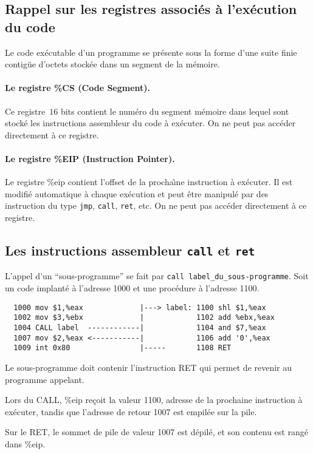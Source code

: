 \begin{frame}
  \section{Rappel sur les registres associ\'es \`a l'ex\'ecution du code}%

        Le code ex\'ecutable d'un programme se pr\'esente sous la forme 
        d'une suite finie contig\"ue d'octets stock\'ee dans un segment 
        de la m\'emoire.

        \paragraph{Le registre \%CS (Code Segment).} Ce registre~$16$
        bits contient le num\'ero du segment m\'emoire dans lequel
        sont stock\'e les instructions assembleur du code \`a
        ex\'ecuter.  On ne peut pas acc\'eder directement \`a ce
        registre.

        \paragraph{Le registre \%EIP (Instruction Pointer).}  Le
        registre \%eip contient l'offset de la procha\^\i{}ne
        instruction \`a ex\'ecuter.  Il est modifi\'e automatique \`a
        chaque ex\'ecution et peut \^etre manipul\'e par des
        instruction du type \texttt{jmp}, \texttt{call}, \texttt{ret},
        etc. On ne peut pas acc\'eder directement \`a ce registre.
\end{frame}
\begin{frame}
  \section{Les instructions assembleur \texttt{call} et
  \texttt{ret}}%

        L'appel d'un ``sous-programme'' se fait par %
        \verb+call label_du_sous-programme+. 
        Soit un code implant\'e \`a l'adresse
        1000 et une proc\'edure \`a l'adresse 1100.

\begin{verbatim}
  1000 mov $1,%eax             |---> label: 1100 shl $1,%eax    
  1002 mov $3,%ebx             |            1102 add %ebx,%eax    
  1004 CALL label  ------------|            1104 and $7,%eax     
  1007 mov $2,%eax <-----------|            1106 add '0',%eax   
  1009 int 0x80                |-----       1108 RET          
\end{verbatim}
        
Le sous-programme doit contenir l'instruction RET qui permet de revenir au
programme appelant. 


Lors du CALL, \%eip re\c{c}oit la valeur 1100, adresse de la prochaine
instruction \`a ex\'ecuter, tandis que l'adresse de retour 1007 est
empil\'ee sur la pile.

Sur le RET, le sommet de pile de valeur 1007 est d\'epil\'e, et son
contenu est rang\'e dans \%eip.
\end{frame}
